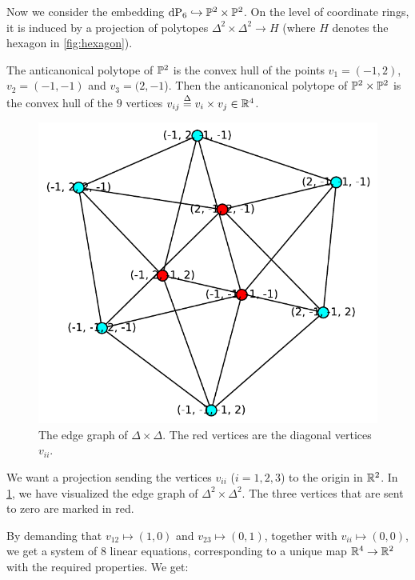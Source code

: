\begin{example}
\label{example:p2p2}
Now we consider the embedding $\dP6 \hookrightarrow \P^2 \times \P^2$. On the level of coordinate rings, it is induced by a projection of polytopes $\Delta^2 \times \Delta^2 \to H$ (where $H$ denotes the hexagon in \cref{fig:hexagon}).

The anticanonical polytope of $\P^2$ is the convex hull of the points $v_1=(-1,2)$, $v_2=(-1,-1)$ and $v_3=(2,-1$). Then the anticanonical polytope of $\P^2 \times \P^2$ is the convex hull of the $9$ vertices $v_{ij} \stackrel{\Delta}{=} v_i \times v_j \in \R^4$.

\begin{figure}
  \centering
  \includegraphics[scale=0.7]{./figures/grafDD.pdf}
  \caption{The edge graph of $\Delta \times \Delta$. The red vertices are the diagonal vertices $v_{ii}$.}
  \label{fig:edgegraphDD}
\end{figure}
We want a projection sending the vertices $v_{ii}$ ($i=1,2,3$) to the origin in $\R^2$. In \cref{fig:edgegraphDD}, we have visualized the edge graph of $\Delta^2 \times \Delta^2$. The three vertices that are sent to zero are marked in red.

By demanding that $v_{12} \mapsto (1,0)$ and $v_{23} \mapsto (0,1)$, together with $v_{ii} \mapsto (0,0)$, we get a system of $8$ linear equations, corresponding to a unique map $\R^4 \to \R^2$ with the required properties. We get:


\end{example}
